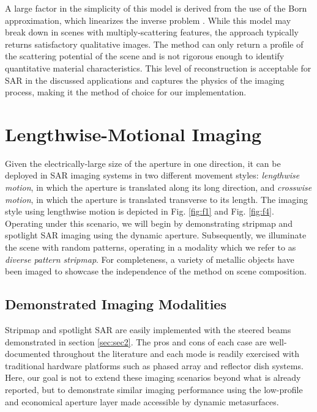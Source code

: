 \documentclass[journal]{IEEEtran}
\begin{document}
A large factor in the simplicity of this model is derived from the use of the Born approximation, which linearizes the inverse problem \cite{lin1990invScatBorn}. While this model may break down in scenes with multiply-scattering features, the approach typically returns satisfactory qualitative images. The method can only return a profile of the scattering potential of the scene and is not rigorous enough to identify quantitative material characteristics. This level of reconstruction is acceptable for SAR in the discussed applications and captures the physics of the imaging process, making it the method of choice for our implementation.


\section{Lengthwise-Motional Imaging}
\label{sec:sec4}

Given the electrically-large size of the aperture in one direction, it can be deployed in SAR imaging systems in two different movement styles: \emph{lengthwise motion}, in which the aperture is translated along its long direction, and \emph{crosswise motion}, in which the aperture is translated transverse to its length. The imaging style using lengthwise motion is depicted in Fig. \ref{fig:f1} and Fig. \ref{fig:f4}. Operating under this scenario, we will begin by demonstrating stripmap and spotlight SAR imaging using the dynamic aperture. Subsequently, we illuminate the scene with random patterns, operating in a modality which we refer to as \emph{diverse pattern stripmap}. For completeness, a variety of metallic objects have been imaged to showcase the independence of the method on scene composition.

\subsection{Demonstrated Imaging Modalities}
\label{ssec:ssecA}

Stripmap and spotlight SAR are easily implemented with the steered beams demonstrated in section \ref{sec:sec2}. The pros and cons of each case are well-documented throughout the literature \cite{soumekh1999SAR,curlander1991SAR} and each mode is readily exercised with traditional hardware platforms such as phased array and reflector dish systems. Here, our goal is not to extend these imaging scenarios beyond what is already reported, but to demonstrate similar imaging performance using the low-profile and economical aperture layer made accessible by dynamic metasurfaces.
\end{document}
